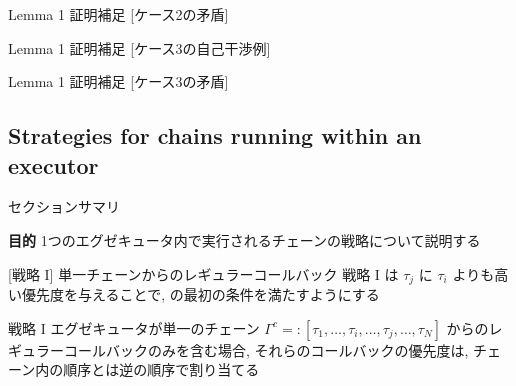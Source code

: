 {    \begin{frame}{Lemma 1 証明補足 [ケース2の矛盾]}
    \end{frame}

    \begin{frame}{Lemma 1 証明補足 [ケース3の自己干渉例]}
    \end{frame}

    \begin{frame}{Lemma 1 証明補足 [ケース3の矛盾]}
    \end{frame}
}


\subsection{Strategies for chains running within an executor}
\label{ssec: strategies for chains running within an executor}

\begin{frame}{セクションサマリ}
    \begin{itembox}[l]{\textbf{目的}}
        1つのエグゼキュータ内で実行されるチェーンの戦略について説明する
    \end{itembox}
\end{frame}

\begin{frame}{}
\end{frame}

\begin{frame}[label=strategy1]{[戦略 I] 単一チェーンからのレギュラーコールバック}
    戦略 I は $\tau_{j}$ に $\tau_{i}$ よりも高い優先度を与えることで,  の最初の条件を満たすようにする
    \begin{block}{戦略 I}
        エグゼキュータが単一のチェーン $\Gamma^{c}=:\left[\tau_{1}, \ldots, \tau_{i}, \ldots, \tau_{j}, \ldots, \tau_{N}\right]$ からのレギュラーコールバックのみを含む場合, それらのコールバックの優先度は, チェーン内の順序とは逆の順序で割り当てる
    \end{block}
\end{frame}


